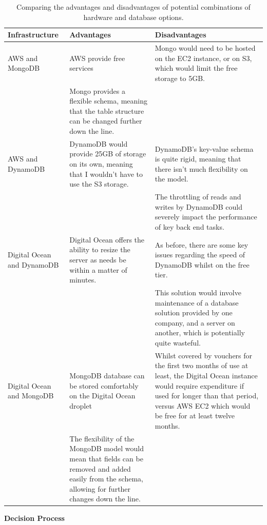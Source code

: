 \documentclass[12pt]{article}
\newcommand{\tabitem}{\makebox[1em][r]{\textbullet~}}
\begin{document}
\begin{table}
    \begin{tabular}{p{4.5cm}|p{7.75cm}|p{7.75cm}}
    \textbf{Infrastructure} & \textbf{Advantages} & \textbf{Disadvantages} \\ \hline
    AWS and MongoDB & \tabitem AWS provide free services & \tabitem Mongo would need to be hosted on the EC2 instance, or on S3, which would limit the free storage to 5GB. \\ & \tabitem Mongo provides a flexible schema, meaning that the table structure can be changed further down the line.  \\ \hline
    AWS and DynamoDB & \tabitem DynamoDB would provide 25GB of storage on its own, meaning that I wouldn't have to use the S3 storage. & \tabitem DynamoDB's key-value schema is quite rigid, meaning that there isn't much flexibility on the model.\\ & & \tabitem The throttling of reads and writes by DynamoDB could severely impact the performance of key back end tasks.\\ \hline
    Digital Ocean and DynamoDB & \tabitem Digital Ocean offers the ability to resize the server as needs be within a matter of minutes. & \tabitem As before, there are some key issues regarding the speed of DynamoDB whilst on the free tier. \\ & &\tabitem This solution would involve maintenance of a database solution provided by one company, and a server on another, which is potentially quite wasteful.  \\ \hline
    Digital Ocean and MongoDB & \tabitem MongoDB database can be stored comfortably on the Digital Ocean droplet & \tabitem Whilst covered by vouchers for the first two months of use at least, the Digital Ocean instance would require expenditure if used for longer than that period, versus AWS EC2 which would be free for at least twelve months.\\ & \tabitem The flexibility of the MongoDB model would mean that fields can be removed and added easily from the schema, allowing for further changes down the line. \\
  \end{tabular}
  \caption[Advantages and Disadvantages of different Infrastructure combinations]{Comparing the advantages and disadvantages of potential combinations of hardware and database options.}
  \label{infrastructuretable}
\end{table}


\textbf{Decision Process}
\end{document}
